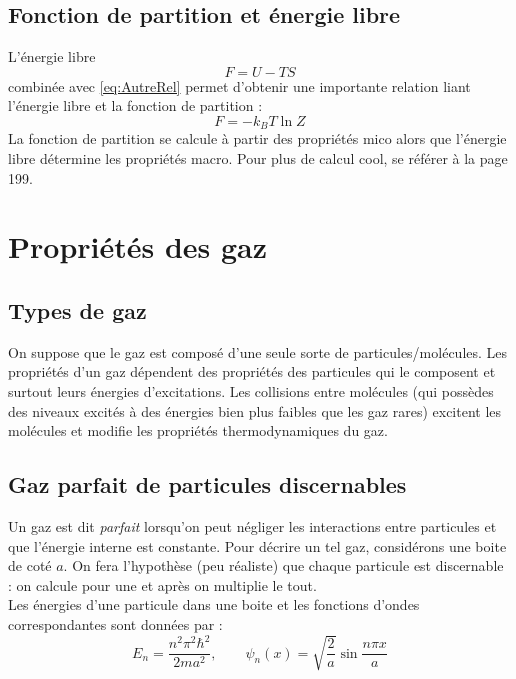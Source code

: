 \documentclass	[11pt, a4paper, openany]{book}
\begin{document}
\section{Fonction de partition et énergie libre}
L'énergie libre 
\begin{equation}
F = U -TS
\end{equation}
combinée avec \autoref{eq:AutreRel} permet d'obtenir une importante relation liant l'énergie
libre et la fonction de partition :
\begin{equation}
F = -k_BT\ln Z
\end{equation}
La fonction de partition se calcule à partir des propriétés mico alors que l'énergie libre 
détermine les propriétés macro. Pour plus de calcul cool, se référer à la page 199.








\chapter{Propriétés des gaz}
\section{Types de gaz}
On suppose que le gaz est composé d'une seule sorte de particules/molécules. Les propriétés d'un gaz 
dépendent des propriétés des particules qui le composent et surtout leurs énergies d'excitations.
Les collisions entre molécules (qui possèdes des niveaux excités à des énergies bien plus faibles
que les gaz rares) excitent les molécules et modifie les propriétés thermodynamiques du gaz.


\section{Gaz parfait de particules discernables}
Un gaz est dit \textit{parfait} lorsqu'on peut négliger les interactions entre particules et que 
l'énergie interne est constante. Pour décrire un tel gaz, considérons une boite de coté $a$. 
On fera l'hypothèse (peu réaliste) que chaque particule est discernable : on calcule pour une 
et après on multiplie le tout.\\
Les énergies d'une particule dans une boite et les fonctions d'ondes correspondantes sont données 
par :
\begin{equation}
E_n = \frac{n^2\pi^2\hbar^2}{2ma^2},\ \ \ \ \ \ \ \ \  \psi_n(x) = \sqrt{\dfrac{2}{a}}\sin
\dfrac{n\pi x}{a}
\end{equation}
\end{document}
